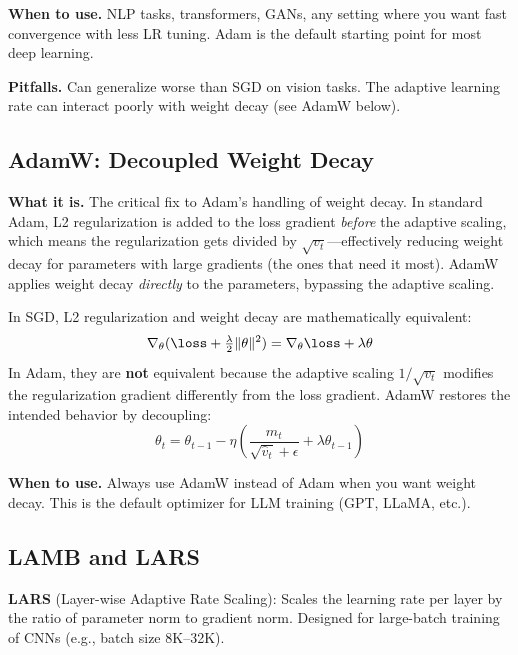 \textbf{When to use.} NLP tasks, transformers, GANs, any setting where you want fast convergence with less LR tuning. Adam is the default starting point for most deep learning.

\textbf{Pitfalls.} Can generalize worse than SGD on vision tasks. The adaptive learning rate can interact poorly with weight decay (see AdamW below).

\subsection{AdamW: Decoupled Weight Decay}

\textbf{What it is.} The critical fix to Adam's handling of weight decay. In standard Adam, L2 regularization is added to the loss gradient \textit{before} the adaptive scaling, which means the regularization gets divided by $\sqrt{v_t}$---effectively reducing weight decay for parameters with large gradients (the ones that need it most). AdamW applies weight decay \textit{directly} to the parameters, bypassing the adaptive scaling.

\begin{keyinsight}
In SGD, L2 regularization and weight decay are mathematically equivalent:
\begin{equation}
\nabla_\theta(\loss + \tfrac{\lambda}{2}\|\theta\|^2) = \nabla_\theta \loss + \lambda\theta
\end{equation}
In Adam, they are \textbf{not} equivalent because the adaptive scaling $1/\sqrt{v_t}$ modifies the regularization gradient differently from the loss gradient. AdamW restores the intended behavior by decoupling:
\begin{equation}
\theta_t = \theta_{t-1} - \eta\left(\frac{\hat{m}_t}{\sqrt{\hat{v}_t} + \epsilon} + \lambda \theta_{t-1}\right)
\end{equation}
\end{keyinsight}

\textbf{When to use.} Always use AdamW instead of Adam when you want weight decay. This is the default optimizer for LLM training (GPT, LLaMA, etc.).

\subsection{LAMB and LARS}

\textbf{LARS} (Layer-wise Adaptive Rate Scaling): Scales the learning rate per layer by the ratio of parameter norm to gradient norm. Designed for large-batch training of CNNs (e.g., batch size 8K--32K).

